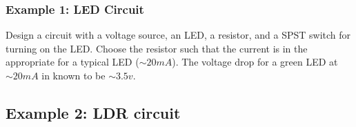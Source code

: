 \documentclass[fleqn]{beamer} %
\newcommand{\sectionIIIsubsectionIIItitle}{Example 1: LED Circuit}
\newcommand{\sectionIIIsubsectionIVtitle}{Example 2: LDR circuit}
\begin{document}
			\begin{frame}
				\frametitle{\sectionIIIsubsectionIIItitle}

				Design a circuit with a voltage source, an LED, a resistor, and a SPST switch for turning on the LED. Choose the resistor such that the current is in the appropriate for a typical LED ($\sim 20mA$). The voltage drop for a green LED at $\sim 20mA$ in known to be $\sim 3.5 v$. \vspace{30mm}

			\end{frame}

		\subsection{\sectionIIIsubsectionIVtitle}\label{sectionIIIsubsectionIV}	
\end{document}
